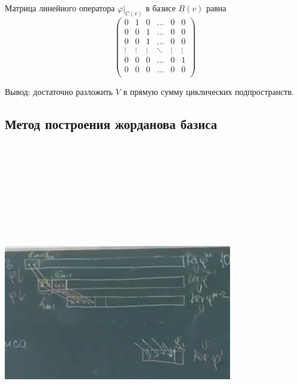 \vspace{\baselineskip}
Матрица линейного оператора $\varphi|_{C(v)}$ в базисе $B(v)$ равна \begin{equation*}\begin{pmatrix} 0 & 1 & 0 & \dots & 0 & 0 \\ 0 & 0 & 1 & \dots & 0 & 0 \\ 0 & 0 & 1 & \dots & 0 & 0 \\ \vdots & \vdots & \vdots & \ddots & \vdots & \vdots \\ 0 & 0 & 0 & \dots & 0 & 1 \\ 0 & 0 & 0 & \dots & 0 & 0 \\ \end{pmatrix}\end{equation*}

Вывод: достаточно разложить $V$ в прямую сумму циклических подпространств.

\subsection{Метод построения жорданова базиса}

\vspace{\baselineskip}
\includegraphics[width=10cm,height=15cm,keepaspectratio]{example7.jpg}


